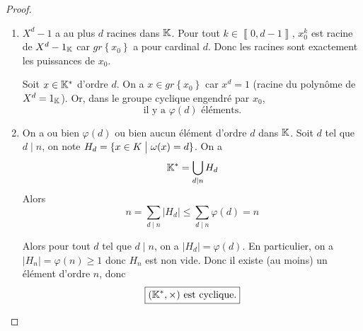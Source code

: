 \documentclass[12pt]{article}
\begin{document}
\begin{proof}
	\phantom{}
	\begin{enumerate}
		\item $X^{d}-1$ a au plus $d$ racines dans $\mathbb{K}$. Pour tout $k\in\left\llbracket 0,d-1\right\rrbracket$, $x_{0}^{k}$ est racine de $X^{d}-1_{\mathbb{K}}$ car $gr\left\{x_{0}\right\}$ a pour cardinal $d$. Donc les racines sont exactement les puissances de $x_{0}$.
		
		Soit $x\in\mathbb{K}^{*}$ d'ordre $d$. On a $x\in gr\left\{x_{0}\right\}$ car $x^{d}=1$ (racine du polynôme de $X^{d}=1_{\mathbb{K}}$). Or, dans le groupe cyclique engendré par $x_{0}$, 
		\begin{equation}
			\boxed{\text{il y a }\varphi(d)\text{ éléments.}}
		\end{equation}

		\item On a ou bien $\varphi(d)$ ou bien aucun élément d'ordre $d$ dans $\mathbb{K}$. Soit $d$ tel que $d\mid n$, on note $H_{d}=\{x\in K\bigm| \omega(x)=d\}$. On a 
		\begin{equation}
			\mathbb{K}^{*}=\bigcup_{d\mid n}H_{d}
		\end{equation}
		Alors
		\begin{equation}
			n=\sum_{d\mid n}\vert H_{d}\vert\leqslant\sum_{d\mid n}\varphi(d)=n
		\end{equation}

		Alors pour tout $d$ tel que $d\mid n$, on a $\vert H_{d}\vert=\varphi(d)$. En particulier, on a $\vert H_{n}\vert=\varphi(n)\geqslant1$ donc $H_{n}$ est non vide. Donc il existe (au moins) un élément d'ordre $n$, donc 
		\begin{equation}
			\boxed{(\mathbb{K}^{*},\times)\text{ est cyclique.}}
		\end{equation}
	\end{enumerate}
\end{proof}
\end{document}
